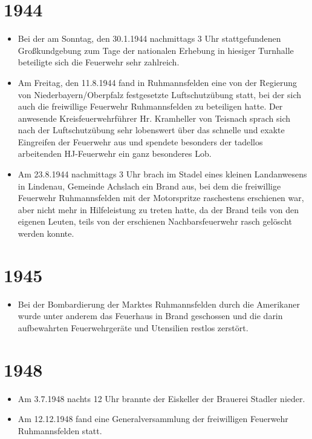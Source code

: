 \documentclass[12pt,a4paper]{book}
\begin{document}
\section*{1944}

\begin{itemize}
\item Bei der am Sonntag, den 30.1.1944 nachmittags 3 Uhr
stattgefundenen Großkundgebung zum Tage der nationalen Erhebung in
hiesiger Turnhalle beteiligte sich die Feuerwehr sehr zahlreich.

\item Am Freitag, den 11.8.1944 fand in Ruhmannsfelden eine von der
Regierung von Niederbayern/Oberpfalz festgesetzte Luftschutzübung statt,
bei der sich auch die freiwillige Feuerwehr Ruhmannsfelden zu beteiligen
hatte. Der anwesende Kreisfeuerwehrführer Hr. Kramheller von Teisnach
sprach sich nach der Luftschutzübung sehr lobenswert über das schnelle
und exakte Eingreifen der Feuerwehr aus und spendete besonders der
tadellos arbeitenden HJ-Feuerwehr ein ganz besonderes Lob.

\item Am 23.8.1944 nachmittags 3 Uhr brach im Stadel eines kleinen
Landanwesens in Lindenau, Gemeinde Achslach ein Brand aus, bei dem die
freiwillige Feuerwehr Ruhmannsfelden mit der Motorspritze raschestens
erschienen war, aber nicht mehr in Hilfeleistung zu treten hatte, da der
Brand teils von den eigenen Leuten, teils von der erschienen
Nachbarsfeuerwehr rasch gelöscht werden konnte.
\end{itemize}

\section*{1945}

\begin{itemize}
\item Bei der Bombardierung der Marktes Ruhmannsfelden durch die
Amerikaner wurde unter anderem das Feuerhaus in Brand geschossen und die
darin aufbewahrten Feuerwehrgeräte und Utensilien restlos zerstört.
\end{itemize}

\section*{1948}

\begin{itemize}
\item Am 3.7.1948 nachts 12 Uhr brannte der Eiskeller der Brauerei
Stadler nieder.

\item Am 12.12.1948 fand eine Generalversammlung der freiwilligen
Feuerwehr Ruhmannsfelden statt.
\end{itemize}
\end{document}
